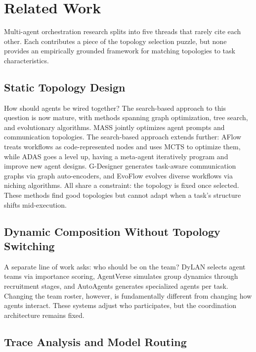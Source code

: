 \section{Related Work}\label{related-work}

Multi-agent orchestration research splits into five threads that rarely cite each other. Each contributes a piece of the topology selection puzzle, but none provides an empirically grounded framework for matching topologies to task characteristics.

\subsection{Static Topology Design}\label{static-topology-design}

How should agents be wired together? The search-based approach to this question is now mature, with methods spanning graph optimization, tree search, and evolutionary algorithms. MASS \cite{hzhou_2025} jointly optimizes agent prompts and communication topologies. The search-based approach extends further: AFlow \cite{zhang_2025_aflow} treats workflows as code-represented nodes and uses MCTS to optimize them, while ADAS \cite{hu_2025} goes a level up, having a meta-agent iteratively program and improve new agent designs. G-Designer \cite{zhang_2025_gdesigner} generates task-aware communication graphs via graph auto-encoders, and EvoFlow \cite{zhang_2025_evoflow} evolves diverse workflows via niching algorithms. All share a constraint: the topology is fixed once selected. These methods find good topologies but cannot adapt when a task's structure shifts mid-execution.

\subsection{Dynamic Composition Without Topology Switching}\label{dynamic-composition}

A separate line of work asks: who should be on the team? DyLAN \cite{liu_2024_dylan} selects agent teams via importance scoring, AgentVerse \cite{chen_2024_agentverse} simulates group dynamics through recruitment stages, and AutoAgents \cite{chen_2024_autoagents} generates specialized agents per task. Changing the team roster, however, is fundamentally different from changing how agents interact. These systems adjust who participates, but the coordination architecture remains fixed.

\subsection{Trace Analysis and Model Routing}\label{trace-analysis-routing}

